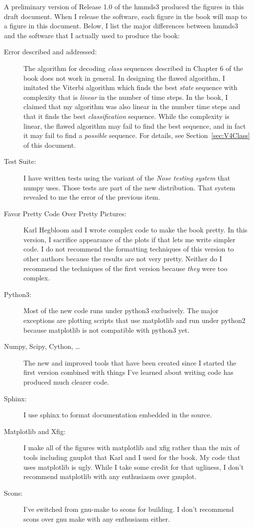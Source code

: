 \documentclass[prelim,showlabels]{book}
\begin{document}
A preliminary version of Release 1.0 of the hmmds3 produced the
figures in this draft document.  When I release the software, each
figure in the book will map to a figure in this document.  Below, I
list the major differences between hmmds3 and the software that I
actually used to produce the book:
\begin{description}
\item[Error described and addressed:] The algorithm for decoding
  \emph{class} sequences described in Chapter 6 of the book does not
  work in general.  In designing the flawed algorithm, I imitated the
  Viterbi algorithm which finds the best \emph{state} sequence with
  complexity that is \emph{linear} in the number of time steps.  In
  the book, I claimed that my algorithm was also linear in the number
  time steps and that it finds the best \emph{classification}
  sequence.  While the complexity is linear, the flawed algorithm may
  fail to find the best sequence, and in fact it may fail to find a
  \emph{possible} sequence.  For details, see
  Section~\ref{sec:V4Class} of this document.
\item[Test Suite:] I have written tests using the variant of the
  \emph{Nose testing system} that numpy uses.  Those tests are part of
  the new distribution.  That system revealed to me the error of the
  previous item.
\item[Favor Pretty Code Over Pretty Pictures:] Karl Hegbloom and I
  wrote complex code to make the book pretty.  In this version, I
  sacrifice appearance of the plots if that lets me write simpler
  code.  I do not recommend the formatting techniques of this version
  to other authors because the results are not very pretty.  Neither do
  I recommend the techniques of the first version because \emph{they}
  were too complex.
\item[Python3:] Most of the new code runs under python3
  exclusively.  The major exceptions are plotting scripts that use
  matplotlib and run under python2 because matplotlib is not
  compatible with python3 yet.
\item[Numpy, Scipy, Cython, \ldots] The new and improved tools that
  have been created since I started the first version combined with
  things I've learned about writing code has produced much clearer
  code.
\item[Sphinx:] I use sphinx to format documentation embedded in the
  source.
\item[Matplotlib and Xfig:] I make all of the figures with matplotlib
  and xfig rather than the mix of tools including gnuplot that Karl
  and I used for the book.  My code that uses matplotlib is ugly.
  While I take some credit for that ugliness, I don't recommend
  matplotlib with any enthusiasm over gnuplot.
\item[Scons:] I've switched from gnu-make to scons for building.  I
  don't recommend scons over gnu make with any enthusiasm either.
\end{description}
\end{document}
